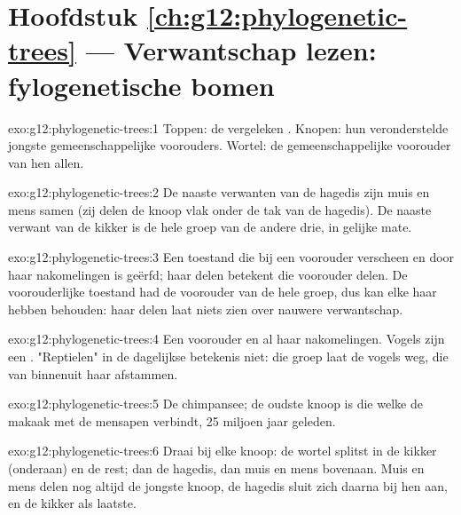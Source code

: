 \section*{Hoofdstuk \ref{ch:g12:phylogenetic-trees} --- Verwantschap lezen: fylogenetische bomen}

\begin{solution}{exo:g12:phylogenetic-trees:1}
Toppen: de vergeleken . Knopen: hun veronderstelde jongste
gemeenschappelijke voorouders. Wortel: de gemeenschappelijke voorouder van
hen allen.
\end{solution}

\begin{solution}{exo:g12:phylogenetic-trees:2}
De naaste verwanten van de hagedis zijn muis en mens samen (zij delen de
knoop vlak onder de tak van de hagedis). De naaste verwant van de kikker
is de hele groep van de andere drie, in gelijke mate.
\end{solution}

\begin{solution}{exo:g12:phylogenetic-trees:3}
Een toestand die bij een voorouder verscheen en door haar nakomelingen is
geërfd; haar delen betekent die voorouder delen. De voorouderlijke
toestand had de voorouder van de hele groep, dus kan elke  haar
hebben behouden: haar delen laat niets zien over nauwere verwantschap.
\end{solution}

\begin{solution}{exo:g12:phylogenetic-trees:4}
Een voorouder en al haar nakomelingen. Vogels zijn een . "Reptielen"
in de dagelijkse betekenis niet: die groep laat de vogels weg, die van
binnenuit haar afstammen.
\end{solution}

\begin{solution}{exo:g12:phylogenetic-trees:5}
De chimpansee; de oudste knoop is die welke de makaak met de mensapen
verbindt, 25 miljoen jaar geleden.
\end{solution}

\begin{solution}{exo:g12:phylogenetic-trees:6}
Draai bij elke knoop: de wortel splitst in de kikker (onderaan) en de
rest; dan de hagedis, dan muis en mens bovenaan. Muis en mens delen nog
altijd de jongste knoop, de hagedis sluit zich daarna bij hen aan, en de
kikker als laatste.
\end{solution}

